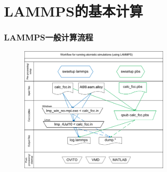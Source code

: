 \section{\rm{LAMMPS}的基本计算}\label{Sec:General}
\frame
{
	\frametitle{\textrm{LAMMPS}一般计算流程}
\begin{figure}[h!]
\centering
\vskip -5pt
\includegraphics[height=2.50in,width=3.0in, viewport=0 0 646 547,clip]{Figures/Lammps_workflow.png}
\caption{\fontsize{6.2pt}{5.2pt}}%
\label{General_Workflow}
\end{figure}
}

